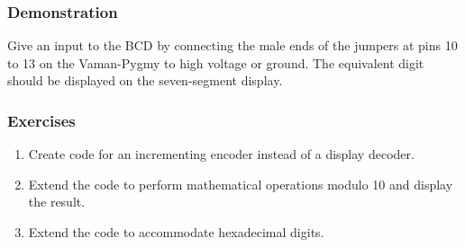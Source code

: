 \subsubsection{Demonstration}
Give an input to the BCD by connecting the male ends of the jumpers at pins 10
to 13 on the Vaman-Pygmy to high voltage or ground. The equivalent digit should
be displayed on the seven-segment display.

\subsubsection{Exercises}
\begin{enumerate}[resume]
    \item Create code for an incrementing encoder instead of a display decoder.
    \item Extend the code to perform mathematical operations modulo 10 and
    display the result.
    \item Extend the code to accommodate hexadecimal digits.
\end{enumerate}